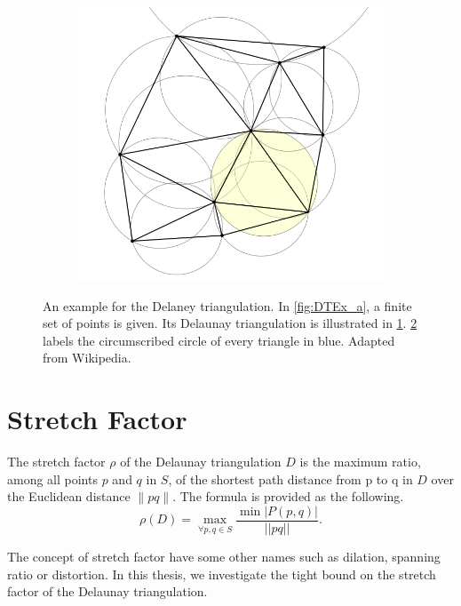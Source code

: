 \begin{figure}[ht]
\begin{subfigure}{0.31\textwidth}
\caption{} \label{fig:DTEx_b}
\end{subfigure}
\hspace*{\fill} %
\begin{subfigure}{0.31\textwidth}
\includegraphics[width=\linewidth]{Figures/DTEx_c.png}
\caption{} \label{fig:DTEx_c}
\end{subfigure}
\caption[An example for the Delaney triangulation.]{An example for the Delaney triangulation.  In \ref{fig:DTEx_a}, a finite set of points is given. Its Delaunay triangulation is illustrated in \ref{fig:DTEx_b}. \ref{fig:DTEx_c} labels the circumscribed circle of every triangle in blue. Adapted from Wikipedia\cite{wiki:DT}.} \label{fig:DTEx}
\end{figure}



\section{ Stretch Factor}
The stretch factor $\rho$ of the Delaunay triangulation $D$ is the maximum ratio, among all points $p$ and $q$ in $S$, of the shortest path distance from p to q in $D$ over the Euclidean distance $\|pq\|$. The formula is provided as the following.
\[\rho(D) = \max_{\forall{p, q\in S}}\frac{{\min{|P(p, q)|}}}{||pq||}.\]

The concept of stretch factor have some other names such as dilation, spanning ratio or distortion.
In this thesis, we investigate the tight bound on the stretch factor of the Delaunay triangulation.  





